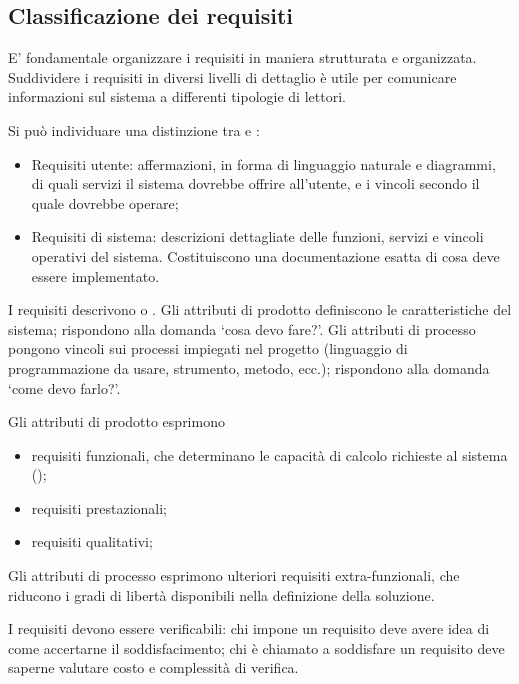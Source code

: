 \subsection{Classificazione dei requisiti}

E' fondamentale organizzare i requisiti in maniera strutturata e organizzata.
Suddividere i requisiti in diversi livelli di dettaglio è utile per comunicare
informazioni sul sistema a differenti tipologie di lettori.

Si può individuare una distinzione tra  e
:

\begin{itemize}
  \item Requisiti utente: affermazioni, in forma di linguaggio naturale e
        diagrammi, di quali servizi il sistema dovrebbe offrire all'utente, e i
        vincoli secondo il quale dovrebbe operare;
  \item Requisiti di sistema: descrizioni dettagliate delle funzioni, servizi e
        vincoli operativi del sistema. Costituiscono una documentazione esatta di
        cosa deve essere implementato.
\end{itemize}

I requisiti descrivono  o . Gli attributi di prodotto definiscono le caratteristiche del sistema;
rispondono alla domanda `cosa devo fare?'. Gli attributi di processo pongono
vincoli sui processi impiegati nel progetto (linguaggio di programmazione da
usare, strumento, metodo, ecc.); rispondono alla domanda `come devo farlo?'.

Gli attributi di prodotto esprimono

\begin{itemize}
  \item requisiti funzionali, che determinano le capacità di calcolo richieste
        al sistema ();
  \item requisiti prestazionali;
  \item requisiti qualitativi;
\end{itemize}

Gli attributi di processo esprimono ulteriori requisiti extra-funzionali, che
riducono i gradi di libertà disponibili nella definizione della soluzione.

I requisiti devono essere verificabili: chi impone un requisito deve avere idea
di come accertarne il soddisfacimento; chi è chiamato a soddisfare un requisito
deve saperne valutare costo e complessità di verifica.

